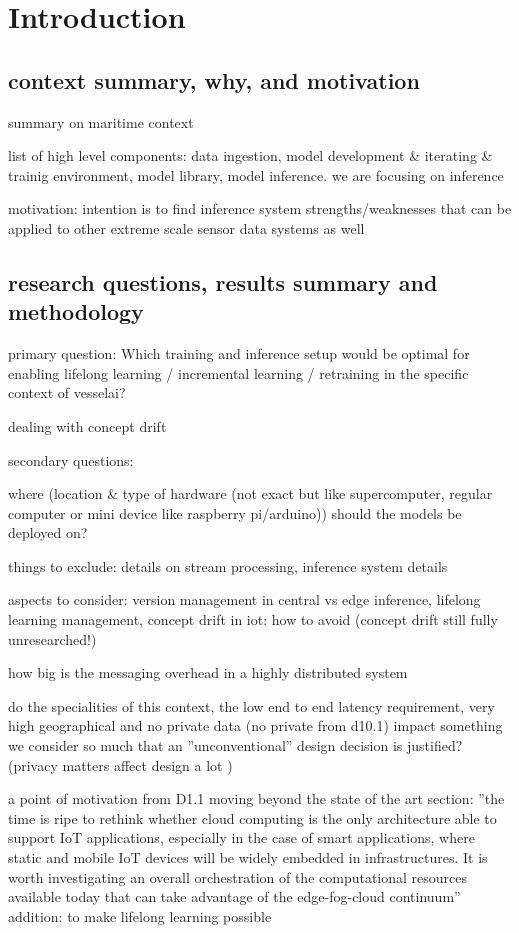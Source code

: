 \chapter{Introduction}

\section{context summary, why, and motivation}
summary on maritime context

list of high level components: data ingestion, model development & iterating & trainig environment, model library, model inference. we are focusing on inference

motivation: intention is to find inference system strengths/weaknesses that can be applied to other extreme scale sensor data systems as well

\section{research questions, results summary and methodology}

primary question: Which training and inference setup would be optimal for enabling lifelong learning / incremental learning / retraining in the specific context of vesselai?

dealing with concept drift

secondary questions:

where (location & type of hardware (not exact but like supercomputer, regular computer or mini device like raspberry pi/arduino)) should the models be deployed on?

things to exclude: details on stream processing, inference system details

aspects to consider: version management in central vs edge inference, lifelong learning management, concept drift in iot: how to avoid (concept drift still fully unresearched!)

how big is the messaging overhead in a highly distributed system

do the specialities of this context, the low end to end latency requirement, very high geographical and no private data (no private from d10.1) impact something we consider so much that an ''unconventional'' design decision is justified? (privacy matters affect design a lot \cite{iotsystems})

a point of motivation from D1.1 moving beyond the state of the art section: ''the time is ripe  to  rethink  whether  cloud  computing  is  the  only  architecture  able  to  support  IoT  applications, especially  in  the  case  of  smart applications,  where  static  and  mobile  IoT  devices  will  be  widely embedded  in  infrastructures.  It  is  worth  investigating  an  overall  orchestration  of  the  computational resources  available  today  that  can  take  advantage  of  the  edge-fog-cloud  continuum'' addition: to make lifelong learning possible


